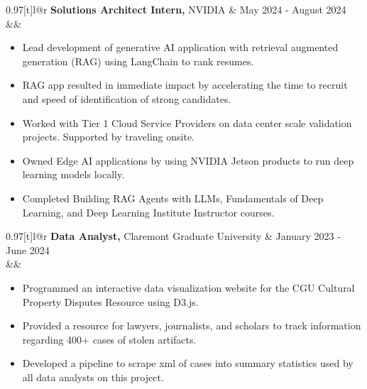 \documentclass[letterpaper,10pt]{article}
\makeatletter
\newcommand{\resumeItem}[1]{
  \item[$\bullet$]\small{
    {#1 \vspace{-2pt}}
  }
}
\newcommand{\jobSubheading}[4]{
  \vspace{-2pt}\item
  \begin{tabular*}{0.97\textwidth}[t]{l@{\extracolsep{\fill}}r}
    \textbf{#1,} #3 & #2 \\
    \ifx&#4&\else\small#4\fi
  \end{tabular*}\vspace{-5pt}
}
\makeatother
\begin{document}
    \jobSubheading
    {Solutions Architect Intern}{May 2024 - August 2024}
    {NVIDIA}{}
    \begin{itemize}\small
    \setlength\itemsep{0em}
      \resumeItem{Lead development of generative AI application with retrieval augmented generation (RAG) using LangChain to rank resumes.}
      \resumeItem{RAG app resulted in immediate impact by accelerating the time to recruit and speed of identification of strong candidates.}
      \resumeItem{ Worked with Tier 1 Cloud Service Providers on data center scale validation projects. Supported by traveling onsite.}
      \resumeItem{Owned Edge AI applications by using NVIDIA Jetson products to run deep learning models locally.}
      \resumeItem{Completed Building RAG Agents with LLMs, Fundamentals of Deep Learning, and Deep Learning Institute Instructor courses. }
    \end{itemize}

    \jobSubheading
      {Data Analyst}{January 2023 - June 2024}
      {Claremont Graduate University}{}
      \begin{itemize}\small
      \setlength\itemsep{0em}
        \resumeItem{ Programmed an interactive data visualization website for the CGU Cultural Property Disputes Resource using D3.js.}
        \resumeItem{ Provided a resource for lawyers, journalists, and scholars to track information regarding 400+ cases of stolen artifacts.}
        \resumeItem{ Developed a pipeline to scrape xml of cases into summary statistics used by all data analysts on this project. }
      \end{itemize}
  
\end{document}
